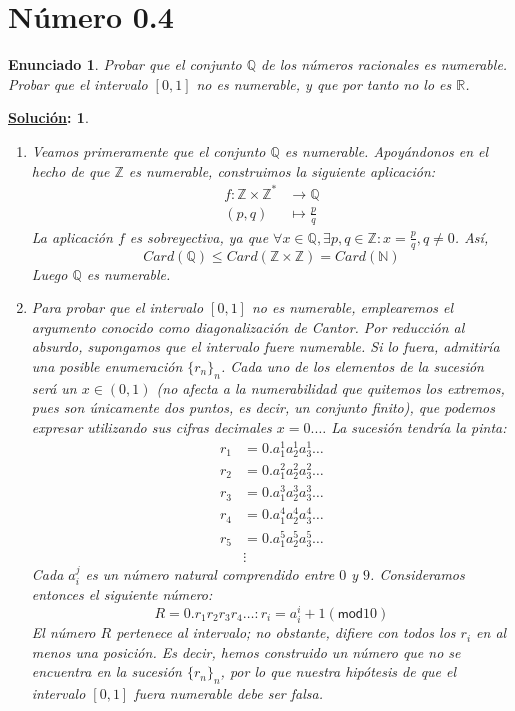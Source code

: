 \documentclass[10pt,a4paper,openright]{book}
\theoremstyle{break}
\newtheorem*{enun}{Enunciado}
\newtheorem*{sol}{\underline{Solución}:}
\begin{document}
\section{Número 0.4}
\begin{enun}
Probar que el conjunto $\mathbb{Q}$ de los números racionales es numerable. Probar que el intervalo $[0,1]$ no es numerable, y que por tanto no lo es $\mathbb{R}$.
\end{enun}
\begin{sol}
\begin{enumerate}[label={(\arabic*)}]
\item Veamos primeramente que el conjunto $\mathbb{Q}$ es numerable. Apoyándonos en el hecho de que $\mathbb{Z}$ es numerable, construimos la siguiente aplicación: \begin{align*}
f: \mathbb{Z} \times \mathbb{Z}^* &\rightarrow \mathbb{Q} \\ 
(p,q) &\mapsto \frac{p}{q}
\end{align*}
La aplicación $f$ es sobreyectiva, ya que $\forall x \in \mathbb{Q}, \exists p,q \in \mathbb{Z} : x = \frac{p}{q}, q \neq 0$. Así, $$Card(\mathbb{Q}) \leq Card(\mathbb{Z} \times \mathbb{Z}) = Card(\mathbb{N})$$ Luego $\mathbb{Q}$ es numerable.
\item Para probar que el intervalo $[0,1]$ no es numerable, emplearemos el argumento conocido como \textit{diagonalización de Cantor}. Por reducción al absurdo, supongamos que el intervalo fuere numerable. Si lo fuera, admitiría una posible enumeración $\{r_n\}_n$. Cada uno de los elementos de la sucesión será un $x \in (0,1)$ (no afecta a la numerabilidad que quitemos los extremos, pues son únicamente dos puntos, es decir, un conjunto finito), que podemos expresar utilizando sus cifras decimales $x = 0.\ldots$ La sucesión tendría la pinta:
\begin{align*}
r_1 &= 0.a_1^1a_2^1a_3^1\ldots \\ 
r_2 &= 0.a_1^2a_2^2a_3^2\ldots \\ 
r_3 &= 0.a_1^3a_2^3a_3^3\ldots \\ 
r_4 &= 0.a_1^4a_2^4a_3^4\ldots \\ 
r_5 &= 0.a_1^5a_2^5a_3^5\ldots \\ 
&\vdots
\end{align*}
Cada $a_i^j$ es un número natural comprendido entre $0$ y $9$. Consideramos entonces el siguiente número: $$R= 0.r_1r_2r_3r_4 \ldots: r_i = a_i^i + 1 (\textsf{mod} 10)$$
El número $R$ pertenece al intervalo; no obstante, difiere con todos los $r_i$ en al menos una posición. Es decir, hemos construido un número que no se encuentra en la sucesión $\{r_n\}_n$, por lo que nuestra hipótesis de que el intervalo $[0,1]$ fuera numerable debe ser falsa.


\end{enumerate}
\end{sol}
\end{document}
